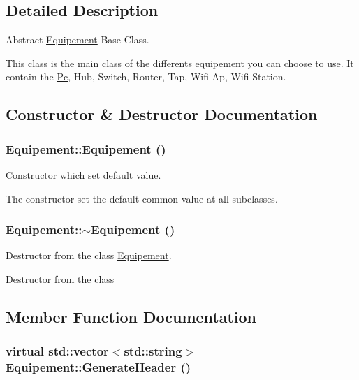\subsection{Detailed Description}
Abstract \hyperlink{class_equipement}{Equipement} Base Class. 

This class is the main class of the differents equipement you can choose to use. It contain the \hyperlink{class_pc}{Pc}, Hub, Switch, Router, Tap, Wifi Ap, Wifi Station. 

\subsection{Constructor \& Destructor Documentation}
\hypertarget{class_equipement_9057a4777d006cbac4c72d09a8d09407}{
\subsubsection[{Equipement}]{\setlength{\rightskip}{0pt plus 5cm}Equipement::Equipement ()}}
\label{class_equipement_9057a4777d006cbac4c72d09a8d09407}


Constructor which set default value. 

The constructor set the default common value at all subclasses. \hypertarget{class_equipement_e7751a52f2665d9e4b3e2cd6929bd986}{
\subsubsection[{$\sim$Equipement}]{\setlength{\rightskip}{0pt plus 5cm}Equipement::$\sim$Equipement ()}}
\label{class_equipement_e7751a52f2665d9e4b3e2cd6929bd986}


Destructor from the class \hyperlink{class_equipement}{Equipement}. 

Destructor from the class 

\subsection{Member Function Documentation}
\hypertarget{class_equipement_32d6f8201afca95d27be3f498cd7d312}{
\subsubsection[{GenerateHeader}]{\setlength{\rightskip}{0pt plus 5cm}virtual std::vector$<$std::string$>$ Equipement::GenerateHeader ()}}
\label{class_equipement_32d6f8201afca95d27be3f498cd7d312}


